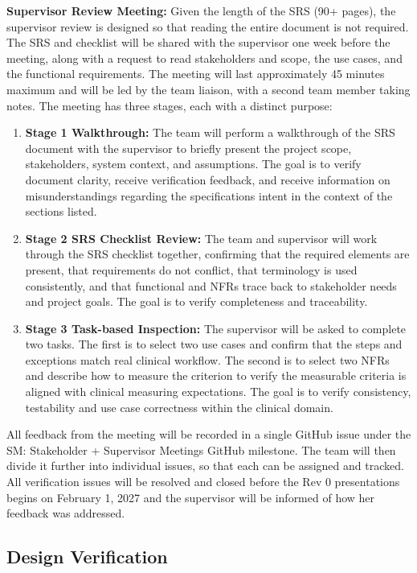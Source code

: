 \documentclass[10pt,titlepage]{article}
\begin{document}
\textbf{Supervisor Review Meeting:} Given the length of the SRS (90+ pages), the supervisor review is designed so that reading the entire document is not required.
The SRS and checklist will be shared with the supervisor one week before the meeting, along with a request to read stakeholders and scope, the use cases, and the 
functional requirements. The meeting will last approximately 45 minutes maximum and will be led by the team liaison, with a second team member taking notes. 
The meeting has three stages, each with a distinct purpose:
\begin{enumerate}
  \item \textbf{Stage 1 Walkthrough:} The team will perform a walkthrough of the SRS document with the supervisor to briefly present the project scope, stakeholders, 
  system context, and assumptions. The goal is to verify document clarity, receive verification feedback, and receive information on misunderstandings regarding the 
  specifications intent in the context of the sections listed.
  \item \textbf{Stage 2 SRS Checklist Review:} The team and supervisor will work through the SRS checklist together, confirming that the required elements are present, 
  that requirements do not conflict, that terminology is used consistently, and that functional and NFRs trace back to stakeholder needs and 
  project goals. The goal is to verify completeness and traceability.
  \item \textbf{Stage 3 Task-based Inspection:} The supervisor will be asked to complete two tasks. The first is to select two use cases and confirm that the steps and 
  exceptions match real clinical workflow. The second is to select two NFRs and describe how to measure the criterion to verify the measurable 
  criteria is aligned with clinical measuring expectations. The goal is to verify consistency, testability and use case correctness within the clinical domain.
\end{enumerate}
All feedback from the meeting will be recorded in a single GitHub issue under the SM: Stakeholder + Supervisor Meetings GitHub milestone. The team will then divide 
it further into individual issues, so that each can be assigned and tracked. All verification issues will be resolved and closed before the Rev 0 presentations begins
on February 1, 2027 and the supervisor will be informed of how her feedback was addressed.

\subsection{Design Verification}\label{sec:DesignVerification}
\end{document}
